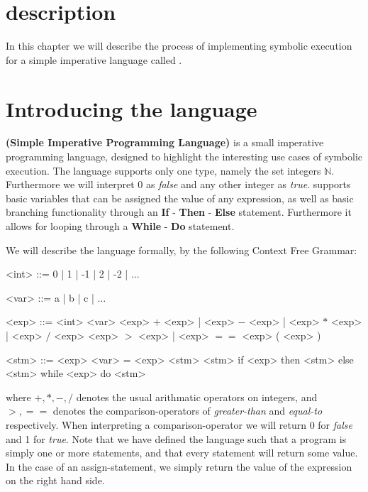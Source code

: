 \section{description}

In this chapter we will describe the process of implementing symbolic execution for a simple imperative language called \simpl.

\section{Introducing the \simpl language}

\simpl\textbf{(Simple Imperative Programming Language)} is a small imperative programming language, designed to highlight the interesting use cases of symbolic execution. The language supports only one type, namely the set integers $\mathbb{N}$.
Furthermore we will interpret 0 as \emph{false} and any other integer as \emph{true}.
 \simpl supports basic
 variables that can be assigned the value of any expression, as well as basic branching functionality through an \textbf{If} - \textbf{Then} - \textbf{Else} statement. Furthermore it allows for looping through a \textbf{While} - \textbf{Do} statement.

We will describe the language formally, by the following Context Free Grammar:

\newpage
\begin{grammar}
	<int> ::= 0 | 1 | -1 | 2 | -2 | $\ldots$
	
	<var> ::= a | b | c | $\ldots$ 
	
	<exp> ::= <int>
	\alt <var>
	\alt <exp> $+$ <exp> | <exp> $-$ <exp> | <exp> $*$ <exp> | <exp> $/$ <exp>
	\alt <exp> $>$ <exp> | <exp> $==$ <exp> 
	\alt ( <exp> )	
	
	<stm> ::= <exp>
	\alt <var> = <exp>
	\alt <stm> <stm>
	\alt if <exp> then <stm> else <stm>
	\alt while <exp> do <stm>
	\alt 
	
\end{grammar}

where $+, *, -, /$ denotes the usual arithmatic operators on integers, and $>, ==$ denotes the comparison-operators of \emph{greater-than} and \emph{equal-to} respectively. When interpreting a comparison-operator we will return 0 for \emph{false} and 1 for \emph{true}. Note that we have defined the language such that a program is simply one or more statements, and that every statement will return some value. In the case of an assign-statement, we simply return the value of the expression on the right hand side. 
